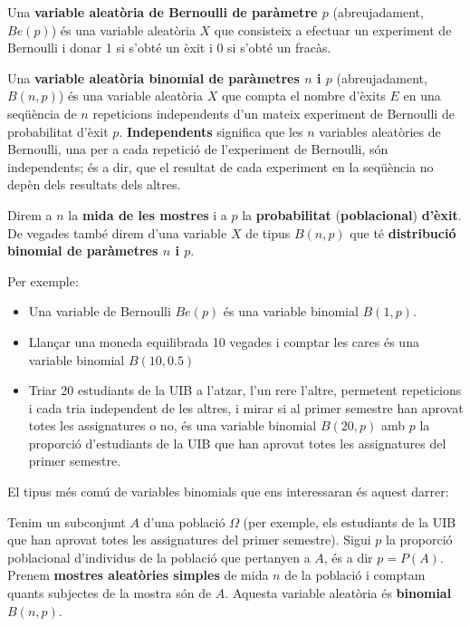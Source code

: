 \documentclass[
]{book}
\newenvironment{rmdblock}[1]
  {
  \begin{itemize}
  \renewcommand{\labelitemi}{
    \raisebox{-.7\height}[0pt][0pt]{
      {\setkeys{Gin}{width=3em,keepaspectratio}\texttt{[image: Bioestadística-II\_files/figure-html/\#1]}}
    }
  }
  \setlength{\fboxsep}{1em}
  \begin{kframe}
  \item
  }
  {
  \end{kframe}
  \end{itemize}
  }
\newenvironment{rmdimportant}
  {\begin{rmdblock}{important}}
  {\end{rmdblock}}
\theoremstyle{definition}
\theoremstyle{definition}
\theoremstyle{definition}
\theoremstyle{remark}
\begin{document}
Una \textbf{variable aleatòria de Bernoulli de paràmetre \(p\)} (abreujadament, \(Be(p)\)) és una variable aleatòria \(X\) que consisteix a efectuar un experiment de Bernoulli i donar 1 si s'obté un èxit i 0 si s'obté un fracàs.

Una \textbf{variable aleatòria binomial de paràmetres \(n\) i \(p\)} (abreujadament, \(B(n,p)\)) és una variable aleatòria \(X\) que compta el nombre d'èxits \(E\) en una seqüència de \(n\) repeticions independents d'un mateix experiment de Bernoulli de probabilitat d'èxit \(p\). \textbf{Independents} significa que les \(n\) variables aleatòries de Bernoulli, una per a cada repetició de l'experiment de Bernoulli, són independents; és a dir, que el resultat de cada experiment en la seqüència no depèn dels resultats dels altres.

Direm a \(n\) la \textbf{mida de les mostres} i a \(p\) la \textbf{probabilitat} (\textbf{poblacional}) \textbf{d'èxit}. De vegades també direm d'una variable \(X\) de tipus \(B(n,p)\) que té \textbf{distribució binomial de paràmetres \(n\) i \(p\)}.

Per exemple:

\begin{itemize}
\item
  Una variable de Bernoulli \(Be(p)\) és una variable binomial \(B(1,p)\).
\item
  Llançar una moneda equilibrada 10 vegades i comptar les cares és una variable binomial \(B(10,0.5)\)
\item
  Triar 20 estudiants de la UIB a l'atzar, l'un rere l'altre, permetent repeticions i cada tria independent de les altres, i mirar si al primer semestre han aprovat totes les assignatures o no, és una variable binomial \(B(20,p)\) amb \(p\) la proporció d'estudiants de la UIB que han aprovat totes les assignatures del primer semestre.
\end{itemize}

El tipus més comú de variables binomials que ens interessaran és aquest darrer:

\begin{rmdimportant}
Tenim un subconjunt \(A\) d'una població \(\Omega\) (per exemple, els estudiants de la UIB que han aprovat totes les assignatures del primer semestre). Sigui \(p\) la proporció poblacional d'individus de la població que pertanyen a \(A\), és a dir \(p=P(A)\). Prenem \textbf{mostres aleatòries simples} de mida \(n\) de la població i comptam quants subjectes de la mostra són de \(A\). Aquesta variable aleatòria és \textbf{binomial} \(B(n,p)\).
\end{rmdimportant}
\end{document}
